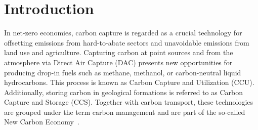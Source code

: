 \documentclass[twocolumn]{article}
\newcommand{\carbon}{CO$_2$}
\begin{document}
\begin{abstract}


\end{abstract}




\section{Introduction}
\label{sec:introduction}

In net-zero economies, carbon capture is regarded as a crucial technology for offsetting emissions from hard-to-abate sectors and unavoidable emissions from land use and agriculture. Capturing carbon at point sources and from the atmosphere via Direct Air Capture (DAC) presents new opportunities for producing drop-in fuels such as methane, methanol, or carbon-neutral liquid hydrocarbons. This process is known as Carbon Capture and Utilization (CCU). Additionally, storing carbon in geological formations is referred to as Carbon Capture and Storage (CCS). Together with carbon transport, these technologies are grouped under the term carbon management and are part of the so-called New Carbon Economy~\cite{arniehellerNewCarbonEconomy2019}.
\end{document}
